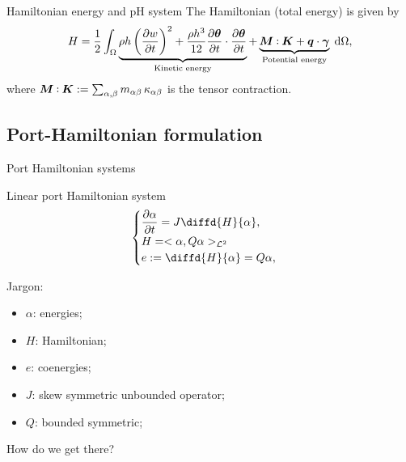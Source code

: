 \documentclass{beamer}
\def\onedot{$\mathsurround0pt\ldotp$}
\def\cddot{%
	\mathbin{\vcenter{\baselineskip.67ex
			\hbox{\onedot}\hbox{\onedot}}%
}}
\begin{document}
\begin{frame}{Hamiltonian energy and pH system}
The Hamiltonian (total energy)  is given by
\begin{equation*} 
H =  \frac{1}{2} \int_{\Omega}\underbrace{ \rho h \left(\diffp{w}{t} \right)^2 +  \frac{\rho h^3}{12} \diffp{\bm{\theta}}{t} \cdot \diffp{\bm{\theta}}{t}  }_{\text{Kinetic energy}} + \underbrace{ \bm{M} \cddot \bm{K} + \bm{q} \cdot \bm{\gamma}}_{\text{Potential energy}}  \d\Omega,
\end{equation*}
where $\bm{M} \cddot \bm{K} := \sum_{\alpha, \beta} m_{\alpha \beta} \, \kappa_{\alpha \beta}$ is the tensor contraction. 
\end{frame}


\subsection{Port-Hamiltonian formulation}

\begin{frame}{Port Hamiltonian systems}
\begin{block}{Linear port Hamiltonian system}
\begin{equation*}
\begin{cases}
\displaystyle\diffp{\alpha}{t} = J \displaystyle\diffd{H}{\alpha},\\
H = <\alpha, Q \alpha>_{\mathcal{L}^2} \\
e := \displaystyle\diffd{H}{\alpha} =  Q \alpha,\\
\end{cases} 
\end{equation*}
\end{block}
Jargon:
\begin{itemize}
\item $\alpha$: {energies};\\
\item $H$: {Hamiltonian}; \\
\item $e$: {coenergies}; \\
\item $J$: {skew symmetric unbounded operator}; \\
\item $Q$: {bounded symmetric}; \\
\end{itemize}
\vspace{.5cm}
How do we get there?
\end{frame}
\end{document}
